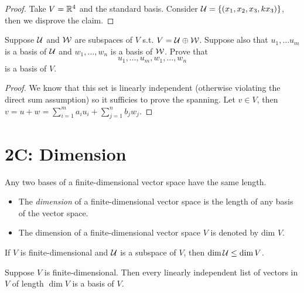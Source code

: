 \documentclass{extarticle}
\begin{document}
\begin{proof}
Take \(V = \mathbb{R}^4\) and the standard basis. Consider \(\mathcal{U} = \{(x_1, x_2, x_3, kx_3)\}\), then 
we disprove the claim. 
\end{proof}

\begin{problem}{10}
    Suppose \(\mathcal{U}\) and \(\mathcal{W}\) are subspaces of \(V\) s.t. \(V = \mathcal{U} \oplus \mathcal{W}\). Suppose 
    also that \(u_1, \ldots u_m\) is a basis of \(\mathcal{U}\) and \(w_1, \ldots, w_n\) is a basis of 
    \(\mathcal{W}\). Prove that 
    \[u_1, \ldots, u_m, w_1, \ldots, w_n\]
    is a basis of \(V\). 
\end{problem}


\begin{proof}
We know 
that this set is linearly independent (otherwise violating the direct sum assumption) 
so it sufficies to prove the spanning. Let \(v \in V\),
then \(v = u + w = \sum_{i=1}^m a_i u_i + \sum_{j=1}^n b_j w_j\). 

\end{proof}


\newpage 

\section*{2C: Dimension}

\begin{lemma}
    Any two bases of a finite-dimensional vector space have the same length. 
\end{lemma}

\begin{definition}[dimension]
    \begin{itemize}
        \item The \emph{dimension} of a finite-dimensional vector space is the length of 
        any basis of the vector space. 
        \item The dimension of a finite-dimensional vector space \(V\) is denoted by dim \(V\).
    \end{itemize}
\end{definition}

\begin{corollary}
    If \(V\) is finite-dimensional and \(\mathcal{U}\) is a subspace of \(V\), then 
    \(\dim \mathcal{U} \leq \dim V\). 
\end{corollary}

\begin{corollary}
    Suppose \(V\) is finite-dimensional. Then every linearly independent list of vectors 
    in \(V\) of length \(\dim V\) is a basis of \(V\). 
\end{corollary}
\end{document}
